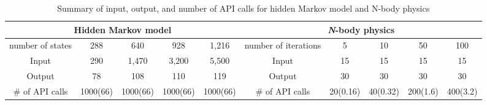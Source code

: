\begin{landscape}
\begin{table}
\centering
\caption{Summary of input, output, and number of API calls for
hidden Markov model and N-body physics}
	\begin{tabular}{c|c|c|c|c|c|c|c|c|c}
	\hline
	 \multicolumn{5}{c|}{Hidden Markov model} &
\multicolumn{5}{c}{\textit{N}-body physics} \\ \hline
	number of states & 288 & 640 & 928 & 1,216 & number of iterations &
5 & 10 & 50 & 100 \\ \hline
	Input & 290 & 1,470 & 3,200 & 5,500 & Input & 15 & 15 & 15 & 15 \\
\hline
	Output & 78 & 108 & 110 & 119 & Output & 30 & 30 & 30 & 30 \\ \hline
	\# of API calls & 1000(66) & 1000(66) & 1000(66) & 1000(66) &
\# of API calls & 20(0.16) & 40(0.32) &
200(1.6) & 400(3.2) \\ \hline
\end{tabular}
\label{table:workload_summary_hn}
\end{table}
\end{landscape}
%
